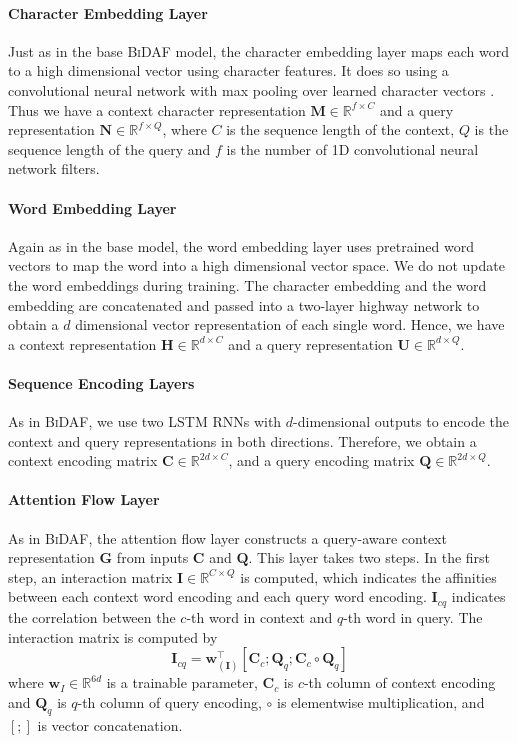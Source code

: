 \documentclass[11pt,letterpaper]{article}
\begin{document}
\paragraph{Character Embedding Layer} Just as in the base \textsc{BiDAF} model, the character embedding layer maps each word to a high dimensional vector using character features. It does so using a convolutional neural network with max pooling over learned character vectors  \cite{Fully_CharCNN_NMT_Lee:2016wl, Kim:2016vh}. Thus we have a context character representation $\bm{M}\in \mathbb{R}^{f\times C}$ and a query representation $\bm{N}\in \mathbb{R}^{f\times Q}$, where $C$ is the sequence length of the context, $Q$ is the sequence length of the query and $f$ is the number of 1D convolutional neural network filters.

\paragraph{Word Embedding Layer} Again as in the base model, the word embedding layer uses pretrained word vectors \citep[the 6B GloVe vectors of ][]{glove_Pennington:2014jd} to map the word into a high dimensional vector space. We do not update the word embeddings during training. The character embedding and the word embedding are concatenated and passed into a two-layer highway network \cite{Highway_network_2015arXiv150500387S} to obtain a $d$ dimensional vector representation of each single word. Hence, we have a context representation $\bm{H}\in \mathbb{R}^{d\times C}$ and a query representation $\bm{U}\in \mathbb{R}^{d\times Q}$.

\paragraph{Sequence Encoding Layers}  As in \textsc{BiDAF}, we use two LSTM RNNs \cite{LSTM_Hochreiter1997} with $d$-dimensional outputs to encode the context and query representations in both directions. Therefore, we obtain a context encoding matrix $\bm{C}\in \mathbb{R}^{2d \times C}$, and a query encoding matrix $\bm{Q}\in \mathbb{R}^{2d \times Q}$.

\paragraph{Attention Flow Layer} As in \textsc{BiDAF}, the attention flow layer constructs a query-aware context representation $\bm{G}$ from inputs $\bm{C}$ and $\bm{Q}$. 
This layer takes two steps. In the first step, an interaction matrix $\bm{I}\in\mathbb{R}^{C \times Q}$ is computed, which indicates the affinities between each context word encoding and each query word encoding. $\bm{I}_{cq}$ indicates the correlation between the $c$-th word in context and $q$-th word in query. The interaction matrix is computed by
\begin{equation}
\bm{I}_{cq} = \bm{w}^{\top}_{(\bm{I})}[\bm{C}_{c};\bm{Q}_{q};\bm{C}_{c}\circ \bm{Q}_{q}]
\end{equation}
where $\bm{w}_{I} \in \mathbb{R}^{6d}$ is a trainable parameter, $\bm{C}_{c}$ is $c$-th column of context encoding and $\bm{Q}_{q}$ is $q$-th column of query encoding, $\circ$ is elementwise multiplication, and $[;]$ is vector concatenation.  
\end{document}
